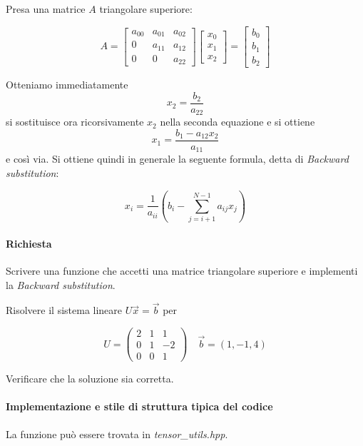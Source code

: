 Presa una matrice $A$ triangolare superiore:

$$
	A = \begin{bmatrix}
		a_{00} & a_{01} & a_{02} \\
		0      & a_{11} & a_{12} \\
		0      & 0      & a_{22}
	\end{bmatrix} \begin{bmatrix}
		x_0 \\ x_1 \\ x_2 \end{bmatrix} = \begin{bmatrix}
		b_0 \\ b_1 \\ b_2 \end{bmatrix}
$$

Otteniamo immediatamente $$x_2 = \frac{b_2}{a_{22}}$$ si sostituisce ora ricorsivamente
$x_2$ nella seconda equazione e si ottiene $$x_1 = \frac{b_1 - a_{12}x_2}{a_{11}}$$ e
così via. Si ottiene quindi in generale la seguente formula, detta di \textit{Backward substitution}:

$$
	x_i = \frac{1}{a_{ii}} ( b_i - \sum_{j=i+1}^{N-1} a_{ij}x_j )
$$

\paragraph{Richiesta}

Scrivere una funzione che accetti una matrice triangolare superiore e implementi 
la \textit{Backward substitution}. 

Risolvere il sistema lineare \( U \vec{x} = \vec{b} \) per

\[
U = \begin{pmatrix} 2 & 1 & 1 \\ 0 & 1 & -2 \\ 0 & 0 & 1 \end{pmatrix} \quad \vec{b} = (1, -1, 4)
\]

Verificare che la soluzione sia corretta.

\paragraph{Implementazione e stile di struttura tipica del codice}

La funzione può essere trovata in \textit{tensor\_utils.hpp}.


